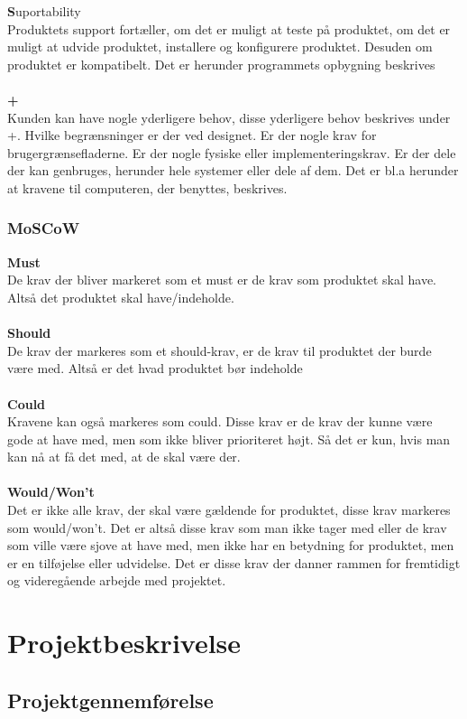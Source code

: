\textbf{S}uportability\\
Produktets support fortæller, om det er muligt at teste på produktet, om det er muligt at udvide produktet, installere og konfigurere produktet. Desuden om produktet er kompatibelt. Det er herunder programmets opbygning beskrives\\\\
\textbf{+}\\
Kunden kan have nogle yderligere behov, disse yderligere behov beskrives under +. Hvilke begrænsninger er der ved designet. Er der nogle krav for brugergrænsefladerne. Er der nogle fysiske eller implementeringskrav. Er der dele der kan genbruges, herunder hele systemer eller dele af dem. Det er bl.a herunder at kravene til computeren, der benyttes, beskrives. \cite{furps}\\
\subsection{MoSCoW}
\textbf{Must}\\
De krav der bliver markeret som et must er de krav som produktet skal have. Altså det produktet skal have/indeholde.\\\\
\textbf{Should}\\
De krav der markeres som et should-krav, er de krav til produktet der burde være med. Altså er det hvad produktet bør indeholde\\\\
\textbf{Could}\\
Kravene kan også markeres som could. Disse krav er de krav der kunne være gode at have med, men som ikke bliver prioriteret højt. Så det er kun, hvis man kan nå at få det med, at de skal være der.\\\\
\textbf{Would/Won't}\\
Det er ikke alle krav, der skal være gældende for produktet, disse krav markeres som would/won't. Det er altså disse krav som man ikke tager med eller de krav som ville være sjove at have med, men ikke har en betydning for produktet, men er en tilføjelse eller udvidelse. Det er disse krav der danner rammen for fremtidigt og videregående arbejde med projektet.
\chapter{Projektbeskrivelse}
\section{Projektgennemførelse}
